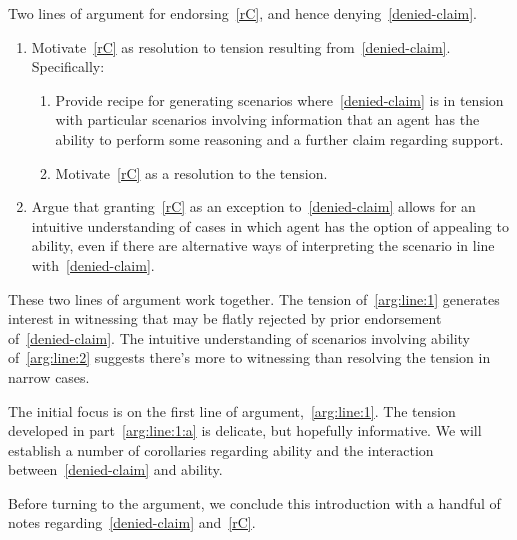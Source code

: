 \begin{note}
  Two lines of argument for endorsing~\ref{rC}, and hence denying~\ref{denied-claim}.
  \begin{enumerate}[label=(L\arabic*), ref=(L\arabic*)]
  \item\label{arg:line:1} Motivate~\ref{rC} as resolution to tension resulting from~\ref{denied-claim}.\newline
    Specifically:
    \begin{enumerate}[label=(L1\alph*)]
    \item\label{arg:line:1:a} Provide recipe for generating scenarios where~\ref{denied-claim} is in tension with particular scenarios involving information that an agent has the ability to perform some reasoning and a further claim regarding support.
    \item\label{arg:line:1:b} Motivate~\ref{rC} as a resolution to the tension.
    \end{enumerate}
  \item\label{arg:line:2} Argue that granting~\ref{rC} as an exception to~\ref{denied-claim} allows for an intuitive understanding of cases in which agent has the option of appealing to ability, even if there are alternative ways of interpreting the scenario in line with~\ref{denied-claim}.
  \end{enumerate}
  These two lines of argument work together.
  The tension of~\ref{arg:line:1} generates interest in witnessing that may be flatly rejected by prior endorsement of~\ref{denied-claim}.
  The intuitive understanding of scenarios involving ability of~\ref{arg:line:2} suggests there's more to witnessing than resolving the tension in narrow cases.
\end{note}

\begin{note}
  The initial focus is on the first line of argument,~\ref{arg:line:1}.
  The tension developed in part~\ref{arg:line:1:a} is delicate, but hopefully informative.
  We will establish a number of corollaries regarding ability and the interaction between~\ref{denied-claim} and ability.
\end{note}

\begin{note}
  Before turning to the argument, we conclude this introduction with a handful of notes regarding~\ref{denied-claim} and~\ref{rC}.
\end{note}

